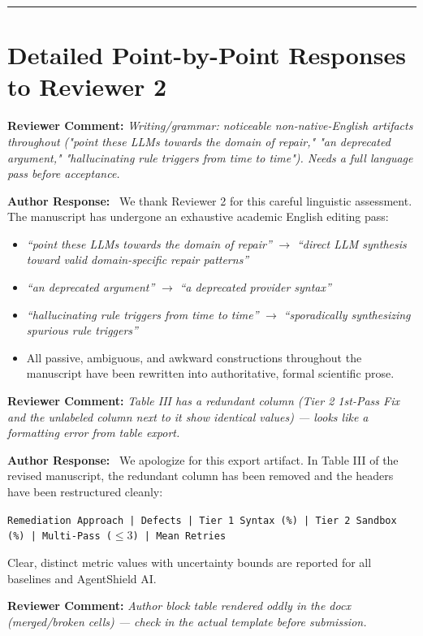 \documentclass[11pt,a4paper]{article}
\newcommand{\reviewercomment}[1]{%
    \vspace{0.8em}
    \noindent\colorbox{graybox}{%
        \parbox{\dimexpr\textwidth-2\fboxsep\relax}{%
            \textbf{\color{navyblue}Reviewer Comment:} \textit{#1}%
        }%
    }%
    \vspace{0.4em}
}
\newcommand{\ourresponse}{%
    \noindent\textbf{\color{navyblue}Author Response:}\ %
}
\begin{document}
\vspace{1em}
\hrule
\vspace{1em}

\section*{Detailed Point-by-Point Responses to Reviewer 2}

\reviewercomment{Writing/grammar: noticeable non-native-English artifacts throughout ("point these LLMs towards the domain of repair," "an deprecated argument," "hallucinating rule triggers from time to time"). Needs a full language pass before acceptance.}

\ourresponse We thank Reviewer 2 for this careful linguistic assessment. The manuscript has undergone an exhaustive academic English editing pass:
\begin{itemize}
    \item \textit{``point these LLMs towards the domain of repair''} $\longrightarrow$ \textit{``direct LLM synthesis toward valid domain-specific repair patterns''}
    \item \textit{``an deprecated argument''} $\longrightarrow$ \textit{``a deprecated provider syntax''}
    \item \textit{``hallucinating rule triggers from time to time''} $\longrightarrow$ \textit{``sporadically synthesizing spurious rule triggers''}
    \item All passive, ambiguous, and awkward constructions throughout the manuscript have been rewritten into authoritative, formal scientific prose.
\end{itemize}

\reviewercomment{Table III has a redundant column (Tier 2 1st-Pass Fix and the unlabeled column next to it show identical values) — looks like a formatting error from table export.}

\ourresponse We apologize for this export artifact. In Table III of the revised manuscript, the redundant column has been removed and the headers have been restructured cleanly:
\begin{center}
\texttt{Remediation Approach | Defects | Tier 1 Syntax (\%) | Tier 2 Sandbox (\%) | Multi-Pass ($\le 3$) | Mean Retries}
\end{center}
Clear, distinct metric values with uncertainty bounds are reported for all baselines and AgentShield AI.

\reviewercomment{Author block table rendered oddly in the docx (merged/broken cells) — check in the actual template before submission.}
\end{document}
